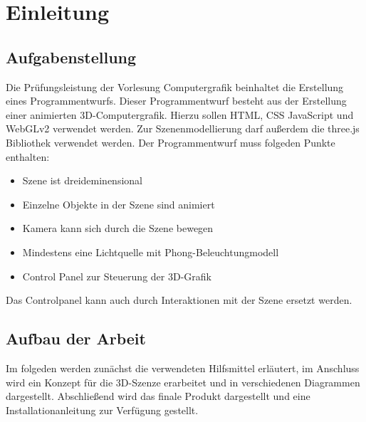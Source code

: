 \section{Einleitung}
\subsection{Aufgabenstellung}
Die Prüfungsleistung der Vorlesung Computergrafik beinhaltet die Erstellung eines Programmentwurfs.
\newline
Dieser Programmentwurf besteht aus der Erstellung einer animierten 3D-Computergrafik.
Hierzu sollen HTML, CSS JavaScript und WebGLv2 verwendet werden. Zur Szenenmodellierung darf außerdem die three.js Bibliothek verwendet werden.
Der Programmentwurf muss folgeden Punkte enthalten:
\begin{itemize}
\item Szene ist dreideminensional
\item Einzelne Objekte in der Szene sind animiert
\item Kamera kann sich durch die Szene bewegen
\item Mindestens eine Lichtquelle mit Phong-Beleuchtungmodell
\item Control Panel zur Steuerung der 3D-Grafik
\end{itemize}
Das Controlpanel kann auch durch Interaktionen mit der Szene ersetzt werden.
\subsection{Aufbau der Arbeit}
Im folgeden werden zunächst die verwendeten Hilfsmittel erläutert,
im Anschluss wird ein Konzept für die 3D-Szenze erarbeitet und in verschiedenen Diagrammen dargestellt.
Abschließend wird das finale Produkt dargestellt und eine Installationanleitung zur Verfügung gestellt.
